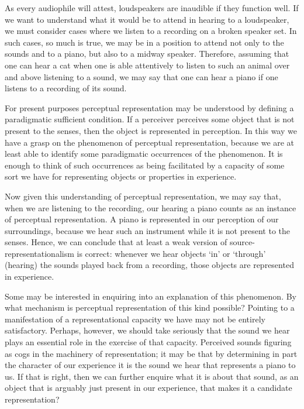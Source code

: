 \documentclass[sloppy, journal, git, bytitle, dodraft]{humapap}
\begin{document}
As every audiophile will attest, loudspeakers are inaudible if they function well. If we want to understand what it would be to attend in hearing to a loudspeaker, we must consider cases where we listen to a recording on a broken speaker set. In such cases, so much is true, we may be in a position to attend not only to the sounds and to a piano, but also to a midway speaker. Therefore, assuming that one can hear a cat when one is able attentively to listen to such an animal over and above listening to a sound, we may say that one can hear a piano if one listens to a recording of its sound.


\sect For present purposes perceptual representation may be understood by defining a paradigmatic sufficient condition. If a perceiver perceives some object that is not present to the senses, then the object is represented in perception. In this way we have a grasp on the phenomenon of perceptual representation, because we are at least able to identify some paradigmatic occurrences of the phenomenon. It is enough to think of such occurrences as being facilitated by a capacity of some sort we have for representing objects or properties in experience. 

Now given this understanding of perceptual representation, we may say that, when we are listening to the recording, our hearing a piano counts as an instance of perceptual representation. A piano is represented in our perception of our surroundings, because we hear such an instrument while it is not present to the senses. Hence, we can conclude that at least a weak version of source-representationalism is correct: whenever we hear objects `in' or `through' (hearing) the sounds played back from a recording, those objects are  represented in experience. %

Some may be interested in enquiring into an explanation of this phenomenon. By what mechanism is perceptual representation of this kind possible? Pointing to a manifestation of a representational capacity we have may not be entirely satisfactory. Perhaps, however, we should take seriously that the sound we hear plays an essential role in the exercise of that capacity. Perceived sounds figuring as cogs in the machinery of representation; it may be that by determining in part the character of our experience it is the sound we hear that represents a piano to us. If that is right, then we can further enquire what it is about that sound, as an object that is arguably just present in our experience, that makes it a candidate representation? 
\end{document}
